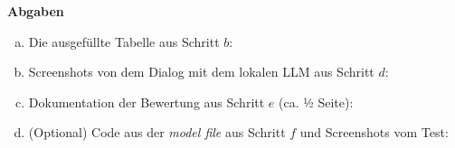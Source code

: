 \documentclass[12pt,ngerman]{AssignmentClass}
\begin{document}
\textbf{Abgaben}
\begin{enumerate}[a)]
\item Die ausgefüllte Tabelle aus Schritt $b$: 
											
\item Screenshots von dem Dialog mit dem lokalen LLM aus Schritt $d$:

\item Dokumentation der Bewertung aus Schritt $e$ (ca. ½ Seite):

\item (Optional) Code aus der \textit{model file} aus Schritt $f$ und Screenshots vom Test:
\end{enumerate}
\end{document}
